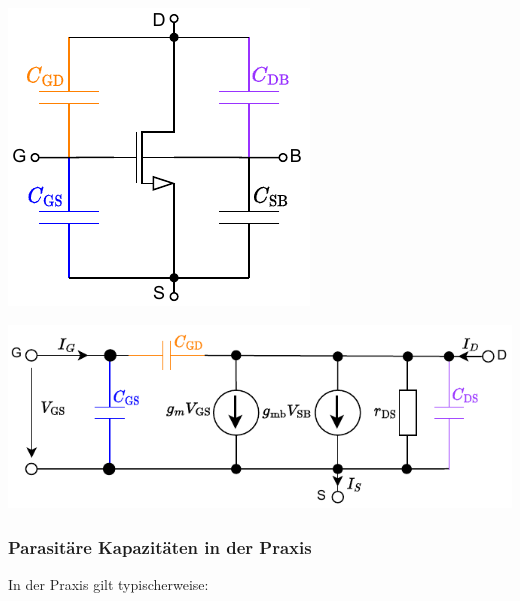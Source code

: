 \begin{minipage}[t]{0.26\columnwidth}
    \includegraphics[width=\columnwidth, align=t]{images/08_parasitaere_C_am_FET.pdf}
\end{minipage}
\hfill
\begin{minipage}[t]{0.7\columnwidth}
    \includegraphics[width=\columnwidth, align=t]{images/08_MOSFET_parasitaere_kapazitaeten_ersatzschaltung.pdf}
\end{minipage}


\subsubsection{Parasitäre Kapazitäten in der Praxis}
\label{Parasitäre Kapazitäten in der Praxis}

In der Praxis gilt typischerweise:

\smallskip

